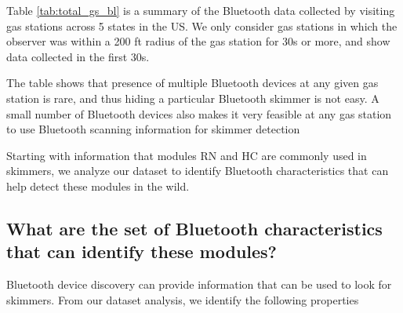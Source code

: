 Table \ref{tab:total_gs_bl} is a summary of the Bluetooth data collected by visiting gas stations across 5 states in the US. We only consider gas stations in which the observer was within a 200 ft radius of the gas station for 30s or more, and show data collected in the first 30s.
    
\begin{table}
\centering
\resizebox{1\columnwidth}{!}{
\begin{tabular}{r|c|c|c|c|c}
\multicolumn{1}{c|}{} & \textbf{CA} & \textbf{AZ} & \textbf{MD} & \textbf{NC} & \textbf{IL}\\
\hline
\multicolumn{1}{r|}{Observation period (months)}    &  12 &  1 &  6 & 5 & 2 \\
\multicolumn{1}{r|}{\# of fuel stations surveyed}    &  613 &  92 &  46 & 28 & 28 \\
\multicolumn{1}{r|}{\# of Bluetooth devices seen}   &  536  & 110  & 46 & 35 & 23  \\
\hline
\end{tabular}
}

\caption{Distribution of gas stations and Bluetooth devices seen by state. The possibility of seeing a classic Bluetooth device at a gas station is fairly low.}
\label{tab:total_gs_bl}
\end{table}

The table shows that presence of multiple Bluetooth devices at any given gas station is rare, and thus hiding a particular Bluetooth skimmer is not easy. A small number of Bluetooth devices also makes it very feasible at any gas station to use Bluetooth scanning information for skimmer detection

Starting with information that modules RN and HC are commonly used in skimmers, we analyze our dataset to identify Bluetooth characteristics that can help detect these modules in the wild.

\subsection {What are the set of Bluetooth characteristics that can identify these modules?}

Bluetooth device discovery can provide information that can be used to look for skimmers. From our dataset analysis, we identify the following properties


